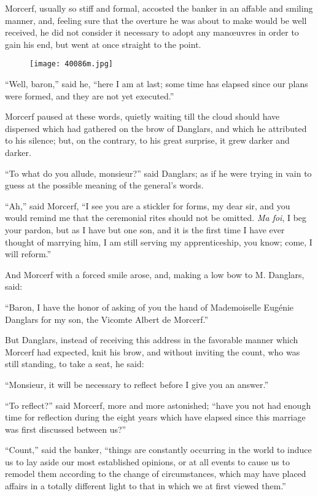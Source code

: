 Morcerf, usually so stiff and formal, accosted the banker in an affable
and smiling manner, and, feeling sure that the overture he was about to
make would be well received, he did not consider it necessary to adopt
any manœuvres in order to gain his end, but went at once straight to
the point.

\begin{figure}[ht]
\texttt{[image: 40086m.jpg]}
\end{figure}

“Well, baron,” said he, “here I am at last; some time has elapsed since
our plans were formed, and they are not yet executed.”

Morcerf paused at these words, quietly waiting till the cloud should
have dispersed which had gathered on the brow of Danglars, and which he
attributed to his silence; but, on the contrary, to his great surprise,
it grew darker and darker.

“To what do you allude, monsieur?” said Danglars; as if he were trying
in vain to guess at the possible meaning of the general’s words.

“Ah,” said Morcerf, “I see you are a stickler for forms, my dear sir,
and you would remind me that the ceremonial rites should not be
omitted. \textit{Ma foi}, I beg your pardon, but as I have but one son, and it
is the first time I have ever thought of marrying him, I am still
serving my apprenticeship, you know; come, I will reform.”

And Morcerf with a forced smile arose, and, making a low bow to M.
Danglars, said:

“Baron, I have the honor of asking of you the hand of Mademoiselle
Eugénie Danglars for my son, the Vicomte Albert de Morcerf.”

But Danglars, instead of receiving this address in the favorable manner
which Morcerf had expected, knit his brow, and without inviting the
count, who was still standing, to take a seat, he said:

“Monsieur, it will be necessary to reflect before I give you an
answer.”

“To reflect?” said Morcerf, more and more astonished; “have you not had
enough time for reflection during the eight years which have elapsed
since this marriage was first discussed between us?”

“Count,” said the banker, “things are constantly occurring in the world
to induce us to lay aside our most established opinions, or at all
events to cause us to remodel them according to the change of
circumstances, which may have placed affairs in a totally different
light to that in which we at first viewed them.”

